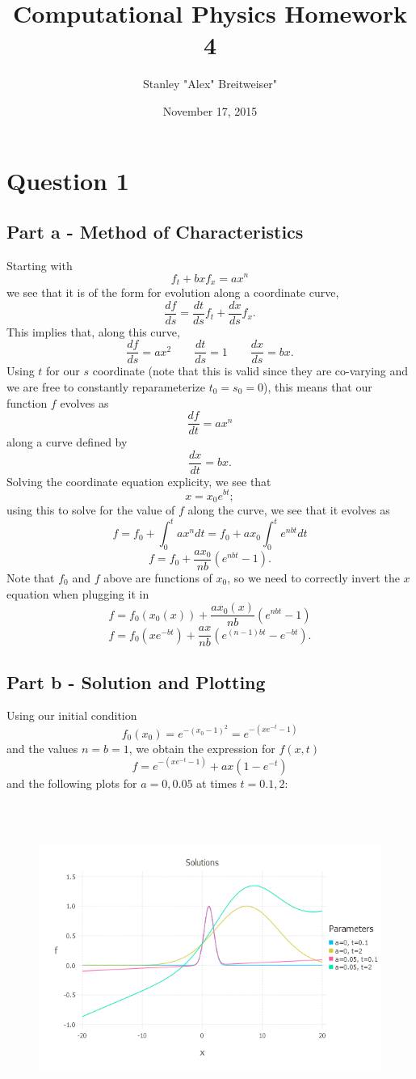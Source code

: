 \documentclass{article}
\title{Computational Physics Homework 4}
\date{November 17, 2015}
\author{Stanley "Alex" Breitweiser"}
\begin{document}
\maketitle

\section{Question 1}
\subsection{Part a - Method of Characteristics}
Starting with
$$f_t + bxf_x = ax^n$$
we see that it is of the form for evolution along a coordinate curve,
$$\frac{df}{ds} = \frac{dt}{ds}f_t + \frac{dx}{ds}f_x.$$
This implies that, along this curve,
$$\frac{df}{ds} = ax^2 \qquad \frac{dt}{ds} = 1 \qquad \frac{dx}{ds}=bx.$$
Using $t$ for our $s$ coordinate (note that this is valid since they are co-varying and we are free to constantly reparameterize $t_0 = s_0 = 0$), this means that our function $f$ evolves as
$$\frac{df}{dt} = ax^n$$
along a curve defined by
$$\frac{dx}{dt} = bx.$$
Solving the coordinate equation explicity, we see that
$$x = x_0e^{bt};$$
using this to solve for the value of $f$ along the curve, we see that it evolves as
$$f = f_0 + \int^t_0 ax^ndt = f_0 + ax_0\int^t_0 e^{nbt}dt$$
$$f = f_0 + \frac{ax_0}{nb}(e^{nbt}-1).$$
Note that $f_0$ and $f$ above are functions of $x_0$, so we need to correctly invert the $x$ equation when plugging it in
$$f = f_0(x_0(x)) + \frac{ax_0(x)}{nb}(e^{nbt}-1)$$
$$f = f_0(xe^{-bt}) + \frac{ax}{nb}(e^{(n-1)bt}-e^{-bt}).$$

\subsection{Part b - Solution and Plotting}
Using our initial condition
$$f_0(x_0) = e^{-(x_0-1)^2} = e^{-(xe^{-t}-1)}$$
and the values $n=b=1$, we obtain the expression for $f(x,t)$
$$f = e^{-(xe^{-t}-1)} + ax(1-e^{-t})$$
and the following plots for $a=0,0.05$ at times $t=0.1,2$:

\begin{figure}[H]
	\includegraphics[width=6in,height=4in]{"q1"}
\end{figure}
\end{document}
